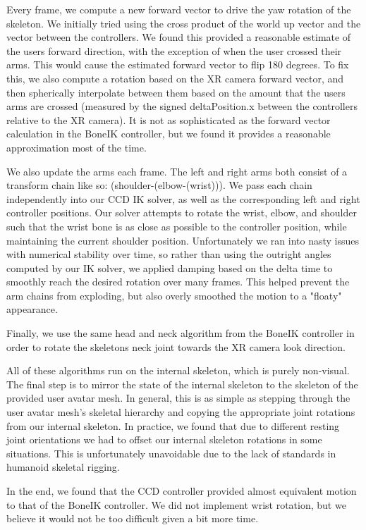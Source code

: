 \documentclass{vgtc}                          %
\begin{document}
    Every frame, we compute a new forward vector to drive the yaw rotation of the skeleton. We initially tried using the cross product of the world up vector and the vector between the controllers. We found this provided a reasonable estimate of the users forward direction, with the exception of when the user crossed their arms. This would cause the estimated forward vector to flip 180 degrees. To fix this, we also compute a rotation based on the XR camera forward vector, and then spherically interpolate between them based on the amount that the users arms are crossed (measured by the signed deltaPosition.x between the controllers relative to the XR camera). It is not as sophisticated as the forward vector calculation in the BoneIK controller, but we found it provides a reasonable approximation most of the time. 

    We also update the arms each frame. The left and right arms both consist of a transform chain like so: (shoulder-(elbow-(wrist))). We pass each chain independently into our CCD IK solver, as well as the corresponding left and right controller positions. Our solver attempts to rotate the wrist, elbow, and shoulder such that the wrist bone is as close as possible to the controller position, while maintaining the current shoulder position. Unfortunately we ran into nasty issues with numerical stability over time, so rather than using the outright angles computed by our IK solver, we applied damping based on the delta time to smoothly reach the desired rotation over many frames. This helped prevent the arm chains from exploding, but also overly smoothed the motion to a "floaty" appearance.

    Finally, we use the same head and neck algorithm from the BoneIK controller in order to rotate the skeletons neck joint towards the XR camera look direction.

    All of these algorithms run on the internal skeleton, which is purely non-visual. The final step is to mirror the state of the internal skeleton to the skeleton of the provided user avatar mesh. In general, this is as simple as stepping through the user avatar mesh's skeletal hierarchy and copying the appropriate joint rotations from our internal skeleton. In practice, we found that due to different resting joint orientations we had to offset our internal skeleton rotations in some situations. This is unfortunately unavoidable due to the lack of standards in humanoid skeletal rigging.

    In the end, we found that the CCD controller provided almost equivalent motion to that of the BoneIK controller. We did not implement wrist rotation, but we believe it would not be too difficult given a bit more time.
\end{document}
